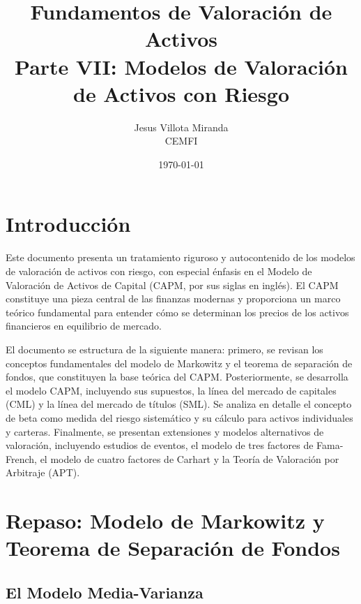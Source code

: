 

\title{\textbf{Fundamentos de Valoración de Activos}\\
\large Parte VII: Modelos de Valoración de Activos con Riesgo}
\author{Jesus Villota Miranda\\
CEMFI}
\date{\today}



\maketitle

\tableofcontents
\newpage

\section{Introducción}

Este documento presenta un tratamiento riguroso y autocontenido de los modelos de valoración de activos con riesgo, con especial énfasis en el Modelo de Valoración de Activos de Capital (CAPM, por sus siglas en inglés). El CAPM constituye una pieza central de las finanzas modernas y proporciona un marco teórico fundamental para entender cómo se determinan los precios de los activos financieros en equilibrio de mercado.

El documento se estructura de la siguiente manera: primero, se revisan los conceptos fundamentales del modelo de Markowitz y el teorema de separación de fondos, que constituyen la base teórica del CAPM. Posteriormente, se desarrolla el modelo CAPM, incluyendo sus supuestos, la línea del mercado de capitales (CML) y la línea del mercado de títulos (SML). Se analiza en detalle el concepto de beta como medida del riesgo sistemático y su cálculo para activos individuales y carteras. Finalmente, se presentan extensiones y modelos alternativos de valoración, incluyendo estudios de eventos, el modelo de tres factores de Fama-French, el modelo de cuatro factores de Carhart y la Teoría de Valoración por Arbitraje (APT).

\section{Repaso: Modelo de Markowitz y Teorema de Separación de Fondos}

\subsection{El Modelo Media-Varianza}

